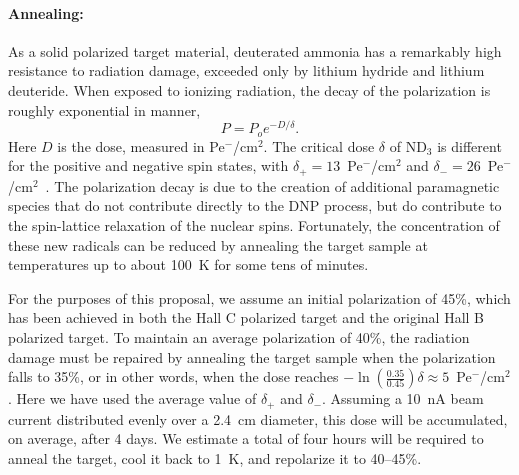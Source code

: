 \vspace{-.15in}
\paragraph{Annealing:}
As a solid polarized target material, deuterated ammonia has a remarkably high resistance to radiation damage, 
exceeded only by lithium hydride and lithium deuteride.
When exposed to ionizing radiation, the decay of the polarization is roughly exponential in manner,
\begin{equation}
  P = P_o e^{-D/\delta}.
\end{equation}
Here $D$ is the dose, measured in Pe$^{\minus}$/cm$^2$.
The critical dose $\delta$ of ND$_3$ is different for the positive and negative spin states, with
$\delta_{\plus} = 13$~Pe$^{\minus}$/cm$^2$ and
$\delta_{\minus} = 26$~Pe$^{\minus}$/cm$^2$~\cite{Goertz2002}.
The polarization decay is due to the creation of additional paramagnetic species
that do not contribute directly to the DNP process, but do contribute to the spin-lattice 
relaxation of the nuclear spins.
Fortunately, the concentration of these new radicals can be reduced by annealing the target sample at temperatures up to about 100~K for some tens of minutes.

For the purposes of this proposal, we assume an initial polarization of 45\%, 
which has been achieved in both the Hall C polarized target and the original Hall B
polarized target.  To maintain an average polarization of 40\%, the radiation 
damage must be repaired by annealing the target sample when the polarization 
falls to 35\%, or in other words, when the dose reaches 
$\minus \ln(\frac{0.35}{0.45})\delta \approx 5$~Pe$^{\minus}$/cm$^2$.  
Here we have used the average value of $\delta_{\plus}$ and $\delta_{\minus}$.  
Assuming a 10~nA beam current distributed evenly over a 2.4~cm diameter, 
this dose will be accumulated, on average, after 4 days.  We estimate a total of four
hours will be required to anneal the target, cool it back to 1~K, and repolarize it to 40--45\%.

\vspace{-.15in}
